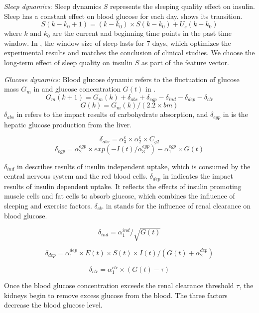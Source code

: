 {\textit{Sleep dynamics}:
Sleep dynamics $S$ represents the sleeping quality effect on insulin.
Sleep has a constant effect on blood glucose for each day.
 shows its transition.
\begin{equation}\label{Eq:S}
S(k-k_0+1)=(k-k_0) \times S(k-k_0)+U_{s}(k-k_0)
\end{equation}
where $k$ and $k_0$ are the current and beginning time points in the past time window.
In \sysname, the window size of sleep lasts for 7 days, which optimizes the experimental results and matches the conclusion of clinical studies.
We choose the long-term effect of sleep quality on insulin $S$ as part of the feature vector.

\textit{Glucose dynamics}:
Blood glucose dynamic refers to the fluctuation of glucose mass $G_m$ in  and glucose concentration $G(t)$ in .
\begin{equation}\label{Eq:Gm}
G_m(k+1)=G_m(k)+\delta_{abs}+\delta_{egp}-\delta_{ind}-\delta_{dep}-\delta_{clr}
\end{equation}
\begin{equation}\label{Eq:G}
G(k)=G_m(k)/(2.2 \times bm)
\end{equation}
$\delta_{abs}$ in  refers to the impact results of carbohydrate absorption, and $\delta_{egp}$ in  is the hepatic glucose production from the liver.

\begin{equation}\label{Eq:abs}
  \delta_{abs}=\alpha_3^c \times \alpha_2^c \times C_{g2}
\end{equation}
\begin{equation}\label{Eq:egp}
  \delta_{egp}=\alpha_2^{egp} \times exp(-I(t)/\alpha_3^{egp})-\alpha_1^{egp} \times G(t)
\end{equation}

$\delta_{ind}$ in  describes results of insulin independent uptake, which is consumed by the central nervous system and the red blood cells.
$\delta_{dep}$ in  indicates the impact results of insulin dependent uptake.
It reflects the effects of insulin promoting muscle cells and fat cells to absorb glucose, which combines the influence of sleeping and exercise factors.
$\delta_{clr}$ in  stands for the influence of renal clearance on blood glucose.

\begin{equation}\label{Eq:ind}
  \delta_{ind}=\alpha_1^{ind}/\sqrt{G(t)}
\end{equation}

\begin{equation}\label{Eq:dep}
  \delta_{dep}=\alpha_1^{dep} \times  E(t) \times S(t) \times I(t)/(G(t)+\alpha_2^{dep})
\end{equation}

\begin{equation}\label{Eq:clr}
  \delta_{clr}=\alpha_1^{clr} \times (G(t)-\tau)
\end{equation}

Once the blood glucose concentration exceeds the renal clearance threshold $\tau$, the kidneys begin to remove excess glucose from the blood.
The three factors decrease the blood glucose level.
}

